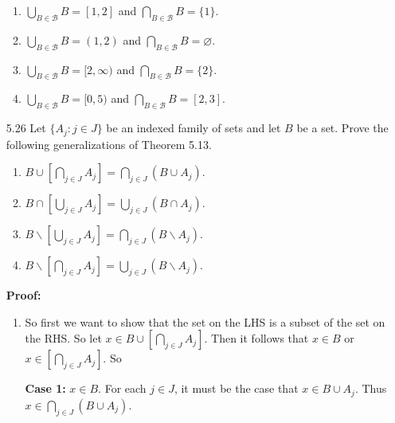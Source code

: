\begin{enumerate}
      \begin{enumerate}
         \item $\bigcup_{B \in\mathscr{B}}B = [1, 2]$ and
               $\bigcap_{B \in\mathscr{B}}B = \{1\}$.
         \item $\bigcup_{B \in\mathscr{B}}B = (1, 2)$ and
               $\bigcap_{B \in\mathscr{B}}B = \varnothing$.
         \item $\bigcup_{B \in\mathscr{B}}B = [2, \infty)$ and
               $\bigcap_{B \in\mathscr{B}}B = \{2\}$.
         \item $\bigcup_{B \in\mathscr{B}}B = [0, 5)$ and
               $\bigcap_{B \in\mathscr{B}}B = [2, 3]$.
      \end{enumerate}
   \item[5.26] Let $\{A_j : j \in J\}$ be an indexed family of sets and let
               $B$ be a set. Prove the following generalizations of Theorem
               5.13.
               \begin{enumerate}
                  \item $\displaystyle B \cup \left[\bigcap_{j \in J}A_j\right] 
                         = \bigcap_{j \in J}(B \cup A_j)$.
                  \item $\displaystyle B \cap \left[\bigcup_{j \in J}A_j\right] 
                         = \bigcup_{j \in J}(B \cap A_j)$.
                  \item $\displaystyle
                         B{\backslash}\left[\bigcup_{j \in J}A_j\right] 
                         = \bigcap_{j \in J}(B{\backslash}A_j)$.
                  \item $\displaystyle
                         B{\backslash}\left[\bigcap_{j \in J}A_j\right] 
                         = \bigcup_{j \in J}(B{\backslash}A_j)$.
               \end{enumerate}

      \textbf{Proof:}

      \begin{enumerate}
         \item So first we want to show that the set on the LHS is a subset of
               the set on the RHS. So let
               $x \in B \cup \left[\bigcap_{j \in J}A_j\right]$. Then it follows
               that $x \in B$ or $x \in \left[\bigcap_{j \in J}A_j\right]$. So
               
               \textbf{Case 1:} $x \in B$. For each $j \in J$, it must be the
               case that $x \in B \cup A_j$. Thus
               $x \in \bigcap_{j \in J}(B \cup A_j)$.
               

\end{enumerate}
\end{enumerate}
